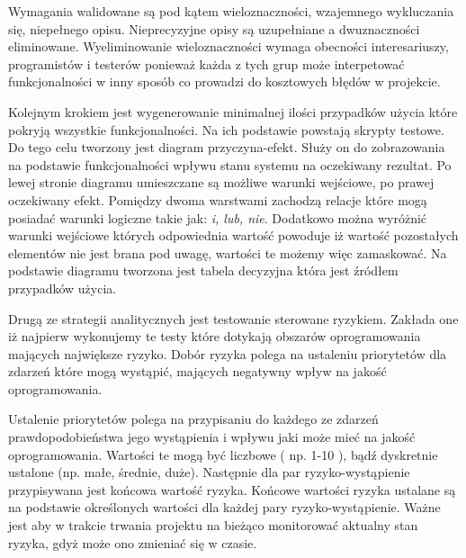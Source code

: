 Wymagania walidowane są pod kątem wieloznaczności, wzajemnego wykluczania się, niepełnego opisu. Nieprecyzyjne opisy są uzupełniane a dwuznaczności eliminowane. Wyeliminowanie wieloznaczności wymaga obecności interesariuszy, programistów i testerów ponieważ każda z tych grup może interpetować funkcjonalności w inny sposób co prowadzi do kosztowych błędów w projekcie.

Kolejnym krokiem jest wygenerowanie minimalnej ilości przypadków użycia które pokryją wszystkie funkcjonalności. Na ich podstawie powstają skrypty testowe. Do tego celu tworzony jest diagram przyczyna-efekt. Służy on do zobrazowania na podstawie funkcjonalności wpływu stanu systemu na oczekiwany rezultat. Po lewej stronie diagramu umieszczane są możliwe warunki wejściowe, po prawej oczekiwany efekt. Pomiędzy dwoma warstwami zachodzą relacje które mogą posiadać warunki logiczne takie jak: \textit{i, lub, nie}. Dodatkowo można wyróżnić warunki wejściowe których odpowiednia wartość powoduje iż wartość pozostałych elementów nie jest brana pod uwagę, wartości te możemy więc zamaskować. Na podstawie diagramu tworzona jest tabela decyzyjna która jest źródłem przypadków użycia.

Drugą ze strategii analitycznych jest testowanie sterowane ryzykiem. Zakłada one iż najpierw wykonujemy te testy które dotykają obszarów oprogramowania mających największe ryzyko.  Dobór ryzyka polega na ustaleniu priorytetów dla zdarzeń które mogą wystąpić, mających negatywny wpływ na jakość oprogramowania.

Ustalenie priorytetów polega na przypisaniu do każdego ze zdarzeń prawdopodobieństwa jego wystąpienia i wpływu jaki może mieć na jakość oprogramowania. Wartości te mogą być liczbowe ( np. 1-10 ), bądź dyskretnie ustalone (np. małe, średnie, duże). Następnie dla par ryzyko-wystąpienie przypisywana jest końcowa wartość ryzyka. Końcowe wartości ryzyka ustalane są na podstawie określonych wartości dla każdej pary ryzyko-wystąpienie. Ważne jest aby w trakcie trwania projektu na bieżąco monitorować aktualny stan ryzyka, gdyż może ono zmieniać się w czasie.

